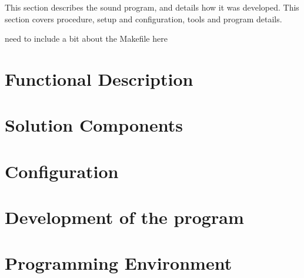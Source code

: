This section describes the sound program, and details how it was developed. This section covers procedure, setup and configuration, tools and program details.

need to include a bit about the Makefile here

\section{Functional Description}
	

\section{Solution Components}
	

\section{Configuration}
	

\section{Development of the program}
	

\section{Programming Environment}
	